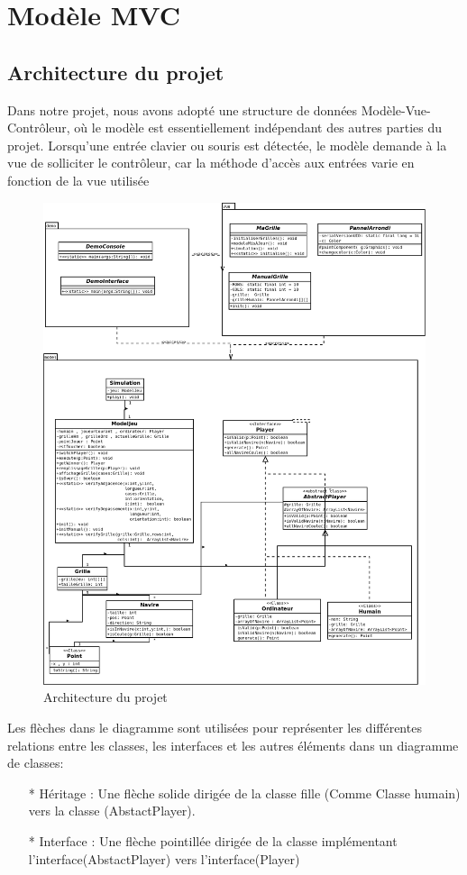 \documentclass{rapport}
\begin{document}
{\section {Modèle MVC}

\subsection{Architecture du projet}

Dans notre projet, nous avons adopté une structure de données Modèle-Vue-Contrôleur, où le modèle est essentiellement indépendant des autres parties du projet. Lorsqu'une entrée clavier ou souris est détectée, le modèle demande à la vue de solliciter le contrôleur, car la méthode d'accès aux entrées varie en fonction de la vue utilisée
\begin{figure}[h]
\centering
\includegraphics[scale=0.3]{images/InterfaceGraphique.png}
\caption{Architecture du projet}
\end{figure}
\newpage

Les flèches dans le diagramme  sont utilisées pour représenter les différentes relations entre les classes, les interfaces et les autres éléments dans un diagramme de classes:
\begin{itemize}
    \item[*] Héritage : Une flèche solide dirigée de la classe fille (Comme Classe humain) vers la classe (AbstactPlayer).
    \item[*] Interface : Une flèche pointillée dirigée de la classe implémentant l'interface(AbstactPlayer) vers l'interface(Player)
\end{itemize}

}
\end{document}
